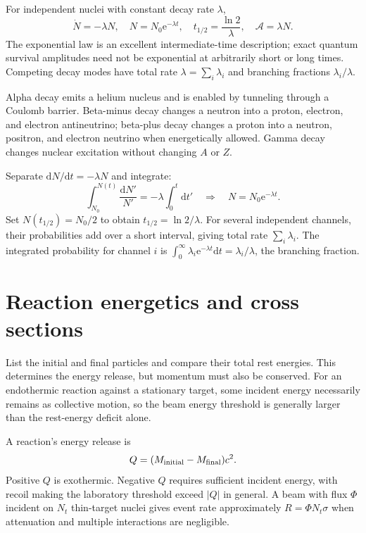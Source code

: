 \documentclass[11pt,oneside]{book}
\newcommand{\dd}{\mathrm{d}}
\newcommand{\ee}{\mathrm{e}}
\theoremstyle{reviewstyle}
\begin{document}
For independent nuclei with constant decay rate $\lambda$,
\begin{equation}\dot N=-\lambda N,\quad N=N_0\ee^{-\lambda t},\quad t_{1/2}=\frac{\ln2}{\lambda},\quad \mathcal A=\lambda N.\end{equation}
The exponential law is an excellent intermediate-time description; exact quantum survival amplitudes need not be exponential at arbitrarily short or long times. Competing decay modes have total rate $\lambda=\sum_i\lambda_i$ and branching fractions $\lambda_i/\lambda$.

Alpha decay emits a helium nucleus and is enabled by tunneling through a Coulomb barrier. Beta-minus decay changes a neutron into a proton, electron, and electron antineutrino; beta-plus decay changes a proton into a neutron, positron, and electron neutrino when energetically allowed. Gamma decay changes nuclear excitation without changing $A$ or $Z$.

Separate $\dd N/\dd t=-\lambda N$ and integrate:
\begin{equation}
\int_{N_0}^{N(t)}\frac{\dd N'}{N'}=-\lambda\int_0^t\dd t'
\quad\Longrightarrow\quad N=N_0\ee^{-\lambda t}.
\end{equation}
Set $N(t_{1/2})=N_0/2$ to obtain $t_{1/2}=\ln2/\lambda$. For several independent channels, their probabilities add over a short interval, giving total rate $\sum_i\lambda_i$. The integrated probability for channel $i$ is $\int_0^\infty\lambda_i\ee^{-\lambda t}\dd t=\lambda_i/\lambda$, the branching fraction.

\section{Reaction energetics and cross sections}
List the initial and final particles and compare their total rest energies. This determines the energy release, but momentum must also be conserved. For an endothermic reaction against a stationary target, some incident energy necessarily remains as collective motion, so the beam energy threshold is generally larger than the rest-energy deficit alone.

A reaction's energy release is
\begin{equation}Q=(M_{\rm initial}-M_{\rm final})c^2.\end{equation}
Positive $Q$ is exothermic. Negative $Q$ requires sufficient incident energy, with recoil making the laboratory threshold exceed $|Q|$ in general. A beam with flux $\Phi$ incident on $N_t$ thin-target nuclei gives event rate approximately $R=\Phi N_t\sigma$ when attenuation and multiple interactions are negligible.
\end{document}
